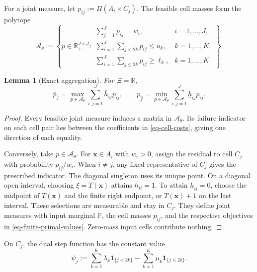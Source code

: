 \documentclass[review,11pt,3p,authoryear,nopreprintline]{elsarticle}
\newtheorem{lemma}{Lemma}
\begin{document}
For a joint measure, let $p_{ij}:=\Pi(A_i\times C_j)$. The feasible cell masses form the polytope
\begin{equation}
  \mathcal A_\theta:=
  \left\{p\in\mathbb R_+^{J\times J}:
  \begin{array}{ll}
    \displaystyle\sum_{j=1}^Jp_{ij}=w_i,&i=1,\ldots,J,\\[1mm]
    \displaystyle\sum_{i=1}^J\sum_{j<2k}p_{ij}\le u_k,&k=1,\ldots,K,\\[1mm]
    \displaystyle\sum_{i=1}^J\sum_{j\le2k}p_{ij}\ge\ell_k,&k=1,\ldots,K
  \end{array}\right\}.
  \label{eq-cell-mass-polytope}
\end{equation}

\begin{lemma}[Exact aggregation]
  \label{lem-exact-aggregation}
  For $\Xi=\mathbb R$,
  \begin{equation}
    \overline p_{\hat f}=\max_{p\in\mathcal A_\theta}\sum_{i,j=1}^J\overline h_{ij}p_{ij},
    \qquad
    \underline p_{\hat f}=\min_{p\in\mathcal A_\theta}\sum_{i,j=1}^J\underline h_{ij}p_{ij}.
    \label{eq-finite-primal-values}
  \end{equation}
\end{lemma}
\begin{proof}
  Every feasible joint measure induces a matrix in $\mathcal A_\theta$. Its failure indicator on each cell pair lies between the coefficients in \eqref{eq-cell-costs}, giving one direction of each equality.

  Conversely, take $p\in\mathcal A_\theta$. For $\bm x\in A_i$ with $w_i>0$, assign the residual to cell $C_j$ with probability $p_{ij}/w_i$. When $i\ne j$, any fixed representative of $C_j$ gives the prescribed indicator. The diagonal singleton uses its unique point. On a diagonal open interval, choosing $\xi=T(\bm x)$ attains $\overline h_{ii}=1$. To attain $\underline h_{ii}=0$, choose the midpoint of $T(\bm x)$ and the finite right endpoint, or $T(\bm x)+1$ on the last interval. These selections are measurable and stay in $C_j$. They define joint measures with input marginal $\mathbb P$, the cell masses $p_{ij}$, and the respective objectives in \eqref{eq-finite-primal-values}. Zero-mass input cells contribute nothing.
\end{proof}

On $C_j$, the dual step function has the constant value
\begin{equation}
  \psi_j:=
  \sum_{k=1}^K\lambda_k\mathbf1_{\{j<2k\}}
  -\sum_{k=1}^K\mu_k\mathbf1_{\{j\le2k\}}.
  \label{eq-dual-cell-values}
\end{equation}
\end{document}
